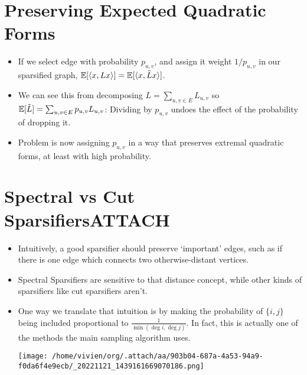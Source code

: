 \documentclass[11pt]{article}
\begin{document}
\section{Preserving Expected Quadratic Forms}
\label{sec:org285ab95}
\begin{itemize}
\item If we select edge with probability \(p_{u,v}\), and assign it weight \(1/p_{u,v}\) in our sparsified graph, \(\mathbb{E}[\langle x , Lx \rangle]=\mathbb{E}[\langle x , \tilde{L}x \rangle]\).
\item We can see this from decomposing \(L=\sum_{u,v \in E}L_{u,v}\) so \(\mathbb{E}[\tilde{L}]=\sum_{u,v \in E}p_{u,v}L_{u,v}\): Dividing by \(p_{u,v}\) undoes the effect of the probability of dropping it.
\item Problem is now assigning \(p_{u,v}\) in a way that preserves extremal quadratic forms, at least with high probability.
\end{itemize}
\section{Spectral vs Cut Sparsifiers\hfill{}\textsc{ATTACH}}
\label{sec:org285602d}
\begin{itemize}
\item Intuitively, a good sparsifier should preserve `important' edges, such as if there is one edge which connects two otherwise-distant vertices.

\item Spectral Sparsifiers are sensitive to that distance concept, while other kinds of sparsifiers like cut sparsifiers aren't.

\item One way we translate that intuition is by making the probability of \(\{i,j\}\) being included proportional to  \(\frac{1}{\min(\deg i, \deg j)}\). In fact, this is actually one of the methods the main sampling algorithm uses.

\begin{center}
\texttt{[image: /home/vivien/org/.attach/aa/903b04-687a-4a53-94a9-f0da6f4e9ecb/\_20221121\_1439161669070186.png]}
\end{center}
\end{itemize}
\end{document}
